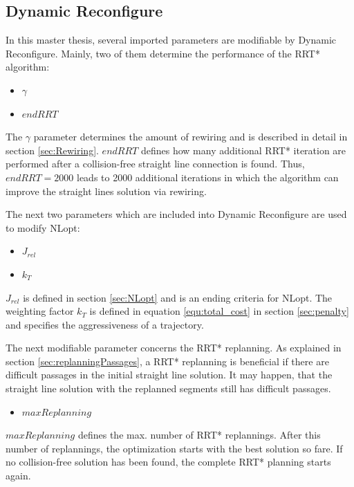 \subsection{Dynamic Reconfigure}\label{sec:dynamicRec}

In this master thesis, several imported parameters are modifiable by Dynamic Reconfigure. Mainly, two of them determine the performance of the RRT* algorithm:

\begin{itemize}
  \item $\gamma$
  \item $endRRT$
\end{itemize}

The $\gamma$ parameter determines the amount of rewiring and is described in detail in section \ref{sec:Rewiring}. $endRRT$ defines how many additional RRT* iteration are performed after a collision-free straight line connection is found. Thus, $endRRT = 2000$ leads to 2000 additional iterations in which the algorithm can improve the straight lines solution via rewiring. \newline

The next two parameters which are included into Dynamic Reconfigure are used to modify NLopt:

\begin{itemize}
  \item $J_{rel}$
  \item $k_T$
\end{itemize}


$J_{rel}$ is defined in section \ref{sec:NLopt} and is an ending criteria for NLopt. The weighting factor $k_T$ is defined in equation \ref{equ:total_cost} in section \ref{sec:penalty} and specifies the aggressiveness of a trajectory. \newline

The next modifiable parameter concerns the RRT* replanning. As explained in section \ref{sec:replanningPassages}, a RRT* replanning is beneficial if there are difficult passages in the initial straight line solution. It may happen, that the straight line solution with the replanned segments still has difficult passages. 

\begin{itemize}
  \item $maxReplanning$
\end{itemize}

$maxReplanning$ defines the max. number of RRT* replannings. After this number of replannings, the optimization starts with the best solution so fare. If no collision-free solution has been found, the complete RRT* planning starts again. \newline

